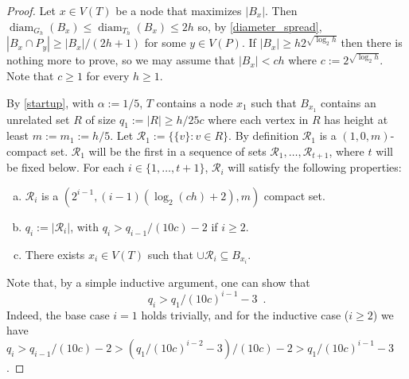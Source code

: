 \documentclass{patmorin}
\DeclareMathOperator{\diam}{diam}
\renewcommand{\le}{\leqslant}
\renewcommand{\ge}{\geqslant}
\renewcommand{\geq}{\geqslant}
\begin{document}
\begin{proof}
  Let $x\in V(T)$ be a node that maximizes $|B_x|$.  Then $\diam_{G_h}(B_x)\le\diam_{T_h}(B_x) \le 2h$ so, by \cref{diameter_spread}, $|B_x\cap P_y|\ge |B_x|/(2h+1)$ for some $y\in V(P)$.  If $|B_x|\ge h2^{\sqrt{\log_2 h}}$ then there is nothing more to prove, so we may assume that $|B_x| < ch$ where $c:= 2^{\sqrt{\log_2 h}}$.  Note that $c\ge 1$ for every $h\ge 1$.

  By \cref{startup}, with $\alpha:= 1/5$, $T$ contains a node $x_1$ such that $B_{x_1}$ contains an unrelated set $R$ of size $q_1:=|R|\ge h/25c$ where each vertex in $R$ has height at least $m:=m_1:=h/5$.  Let  $\mathcal{R}_1:=\{\{v\}:v\in R\}$.  By definition $\mathcal{R}_1$ is a $(1,0,m)$-compact set.  $\mathcal{R}_1$ will be the first in a sequence of sets $\mathcal{R}_1,\ldots,\mathcal{R}_{t+1}$, where $t$ will be fixed below. For each $i\in\{1,\ldots,t+1\}$, $\mathcal{R}_i$ will satisfy the following properties:
  \begin{enumerate}[(a)]
     \item $\mathcal{R}_i$ is a $(2^{i-1},(i-1)(\log_2(ch)+2),m)$ compact set. \label{ri_compact}
     \item $q_i:=|\mathcal{R}_i|$, with $q_i > q_{i-1}/(10c) - 2$ if $i\ge 2$. \label{ri_size}
     \item There exists $x_i\in V(T)$ such that $\cup\mathcal{R}_i\subseteq B_{x_i}$. \label{ri_containment}
  \end{enumerate}
  Note that, by a simple inductive argument, one can show that
  \[
  q_i > q_1/(10c)^{i-1} - 3 \enspace .
  \]
  Indeed, the base case $i=1$ holds trivially, and for the inductive case ($i\geq 2$) we have $q_i > q_{i-1}/(10c) - 2 > (q_1/(10c)^{i-2} - 3)/(10c) -2 > q_1/(10c)^{i-1} - 3$.


\end{proof}
\end{document}
